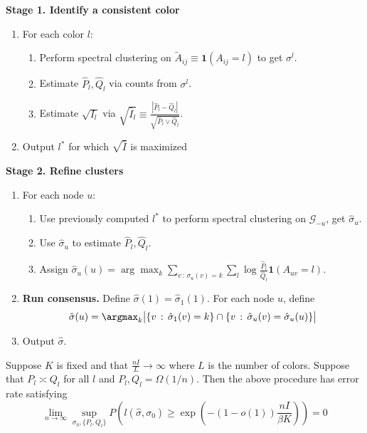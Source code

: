\documentclass{article}
\begin{document}
\textbf{Stage 1. Identify a consistent color}
\begin{enumerate}
\item For each color $l$:
  \begin{enumerate}
   \item Perform spectral clustering on $\tilde{A}_{ij} \equiv \mathbf{1}(A_{ij} = l)$ to get $\sigma^l$.
   \item Estimate $\hat{P}_l, \hat{Q}_l$ via counts from $\sigma^l$. 
   \item Estimate $\sqrt{I_l}$ via 
  $\sqrt{ \hat{I}_l } \equiv \frac{| \hat{P}_l - \hat{Q}_l |}{\sqrt{ \hat{P}_l \vee \hat{Q}_l}}$. 
   \end{enumerate}
\item Output $l^*$ for which $\sqrt{\hat{I}}$ is maximized
\end{enumerate}

 \textbf{Stage 2. Refine clusters}
\begin{enumerate}
\item For each node $u$:
  \begin{enumerate}
  \item Use previously computed $l^*$ to perform spectral clustering on $\mathcal{G}_{-u}$, get $\hat{\sigma}_u$.
   \item Use $\hat{\sigma}_u$ to estimate $\hat{P}_l, \hat{Q}_l$.
   \item Assign $\hat{\sigma}_u(u) = \arg\max_k \sum_{v \,:\, \sigma_u(v) = k} \sum_l 
                  \log \frac{\hat{P}_l}{\hat{Q}_l} \mathbf{1}(A_{uv} = l) $. 
   \end{enumerate}

\item \textbf{Run consensus.} 
  \subitem Define $\hat{\sigma}(1) = \hat{\sigma}_1(1)$. 
  \subitem For each node $u$, define 
 \[
\hat{\sigma}(u) = \argmax_k 
         \big |  \{ v \,:\, \hat{\sigma}_1(v) = k \} \cap \{ v \,:\, \hat{\sigma}_u(v) = \hat{\sigma}_u(u)  \} \big| 
\]
\item Output $\hat{\sigma}$. 

\end{enumerate}

\begin{proposition}
\label{prop:rate_optimal}
Suppose $K$ is fixed and that $\frac{n I}{L} \rightarrow \infty$ where $L$ is the number of colors. Suppose that $P_l \asymp Q_l$ for all $l$ and $P_l, Q_l = \Omega(1/n)$. Then the above procedure has error rate satisfying
\[
\lim_{n \rightarrow \infty}  \sup_{\sigma_0, \{P_l, Q_l\}} P \left( l(\hat{\sigma}, \sigma_0) \geq \exp\left( - (1 - o(1)) \frac{ n I }{\beta K} \right) \right) = 0
\]
\end{proposition}
\end{document}
